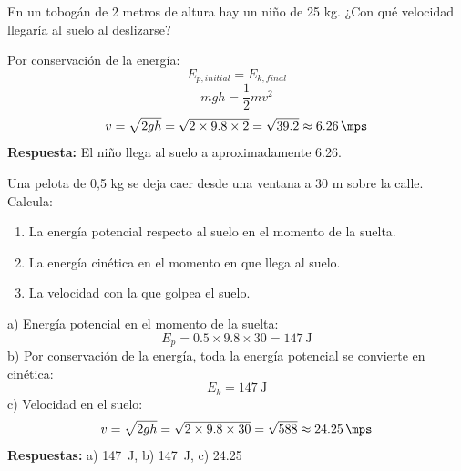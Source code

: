 \begin{exercise}
    En un tobogán de 2 metros de altura hay un niño de 25 kg. ¿Con qué velocidad llegaría al suelo al deslizarse?
    \begin{solu}
        Por conservación de la energía:
        \[
            E_{p,initial} = E_{k,final}
        \]
        \[
            mgh = \frac{1}{2}mv^2
        \]
        \[
            v = \sqrt{2gh} = \sqrt{2 \times 9.8 \times 2} = \sqrt{39.2} \approx \qty{6.26}{\mps}
        \]
        \textbf{Respuesta:} El niño llega al suelo a aproximadamente \qty{6.26}{\mps}.
    \end{solu}
\end{exercise}

\begin{exercise}
    Una pelota de 0,5 kg se deja caer desde una ventana a 30 m sobre la calle. Calcula:
    \begin{enumerate}[label=\alph*)]
\item La energía potencial respecto al suelo en el momento de la suelta.
\item La energía cinética en el momento en que llega al suelo.
\item La velocidad con la que golpea el suelo.
    \end{enumerate}
    \begin{solu}
        a) Energía potencial en el momento de la suelta:
        \[
            E_p = 0.5 \times 9.8 \times 30 = \qty{147}{\joule}
        \]
        b) Por conservación de la energía, toda la energía potencial se convierte en cinética:
        \[
            E_k = \qty{147}{\joule}
        \]
        c) Velocidad en el suelo:
        \[
            v = \sqrt{2gh} = \sqrt{2 \times 9.8 \times 30} = \sqrt{588} \approx \qty{24.25}{\mps}
        \]
        \textbf{Respuestas:} a) \qty{147}{\joule}, b) \qty{147}{\joule}, c) \qty{24.25}{\mps}
    \end{solu}
\end{exercise}

